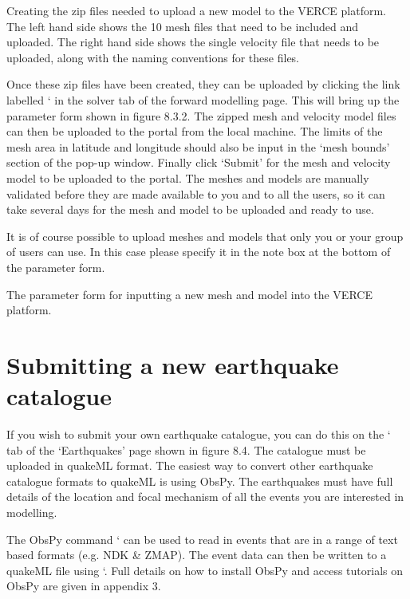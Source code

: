 \documentclass[english]{book}
\begin{document}

 Creating the zip files needed to upload a new model to
the VERCE platform. The left hand side shows the 10 mesh files that need
to be included and uploaded. The right hand side shows the single
velocity file that needs to be uploaded, along with the naming
conventions for these files.

Once these zip files have been created, they can be uploaded by clicking
the link labelled ‘ in the solver tab of the forward modelling page. This will
bring up the parameter form shown in figure 8.3.2. The zipped mesh and
velocity model files can then be uploaded to the portal from the local
machine. The limits of the mesh area in latitude and longitude should
also be input in the ‘mesh bounds’ section of the pop-up window. Finally
click ‘Submit’ for the mesh and velocity model to be uploaded to the
portal. The meshes and models are manually validated before they are
made available to you and to all the users, so it can take several days
for the mesh and model to be uploaded and ready to use.

It is of course possible to upload meshes and models that only you or
your group of users can use. In this case please specify it in the note
box at the bottom of the parameter form.


 The parameter form for inputting a new mesh and model
into the VERCE platform.


\section{Submitting a new earthquake catalogue}
\label{\detokenize{Section8:submitting-a-new-earthquake-catalogue}}

If you wish to submit your own earthquake catalogue, you can do this on
the ‘ tab of the ‘Earthquakes’ page shown in figure 8.4. The
catalogue must be uploaded in quakeML format. The easiest way to convert
other earthquake catalogue formats to quakeML is using ObsPy. The
earthquakes must have full details of the location and focal mechanism
of all the events you are interested in modelling.

The ObsPy command ‘ can be used to read in events that
are in a range of text based formats (e.g. NDK \& ZMAP). The event data
can then be written to a quakeML file using ‘. Full
details on how to install ObsPy and access tutorials on ObsPy are given
in appendix 3.
\end{document}
